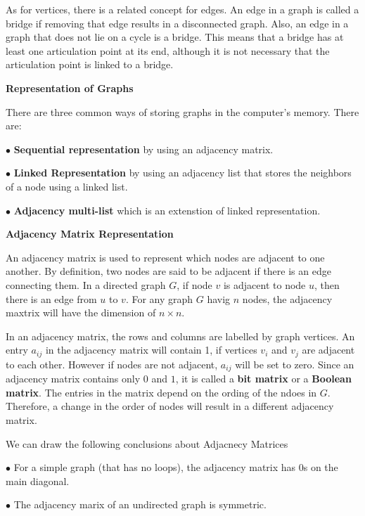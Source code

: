 \vskip 1mm
As for vertices, there is a related concept for edges. An edge in a graph is called a bridge if removing that edge results in a disconnected graph. Also, an edge in a graph that does not lie on a cycle is a bridge. This means that a bridge has at least one articulation point at its end, although it is not necessary that the articulation point is linked to a bridge.

\filbreak
\vskip 1cm
{\bf Representation of Graphs}

\vskip 1mm
There are three common ways of storing graphs in the computer's memory. There are:

\vskip 3mm
\qquad$\bullet$ {\bf Sequential representation} by using an adjacency matrix.

\vskip 3mm
\qquad$\bullet$ {\bf Linked Representation} by using an adjacency list that stores the neighbors of a node using a linked list.

\vskip 3mm
\qquad$\bullet$ {\bf Adjacency multi-list} which is an extenstion of linked representation.

\filbreak
\vskip 1cm
{\bf Adjacency Matrix Representation}

\vskip 1mm
An adjacency matrix is used to represent which nodes are adjacent to one another. By definition, two nodes are said to be adjacent if there is an edge connecting them.
\vskip 1mm
In a directed graph $G$, if node $v$ is adjacent to node $u$, then there is an edge from $u$ to $v$. For any graph $G$ havig $n$ nodes, the adjacency maxtrix will have the dimension of $n\times n$.

\vskip 1mm
In an adjacency matrix, the rows and columns are labelled by graph vertices. An entry $a_{ij}$ in the adjacency matrix will contain 1, if vertices $v_i$ and $v_j$ are adjacent to each other. However if nodes are not adjacent, $a_{ij}$ will be set to zero. Since an adjacency matrix contains only $0$ and $1$, it is called a {\bf bit matrix} or a {\bf Boolean matrix}. The entries in the matrix depend on the ording of the ndoes in $G$. Therefore, a change in the order of nodes will result in a different adjacency matrix.

\vskip 2mm
We can draw the following conclusions about Adjacnecy Matrices

\vskip 3mm
\qquad$\bullet$ For a simple graph (that has no loops), the adjacency matrix has $0$s on the main diagonal.

\vskip 3mm
\qquad$\bullet$ The adjacency marix of an undirected graph is symmetric.

